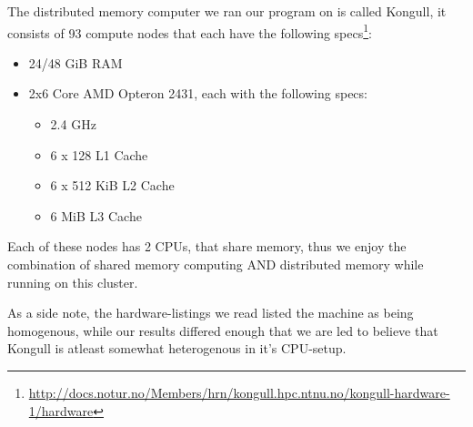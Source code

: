 The distributed memory computer we ran our program on is called Kongull, it consists of 93 compute nodes that each have the following specs\footnote{\url{http://docs.notur.no/Members/hrn/kongull.hpc.ntnu.no/kongull-hardware-1/hardware}}:
\begin{itemize}
    \item 24/48 GiB RAM
    \item 2x6 Core AMD Opteron 2431, each with the following specs:
    \begin{itemize}
        \item 2.4 GHz
        \item 6 x 128 L1 Cache
        \item 6 x 512 KiB L2 Cache
        \item 6 MiB L3 Cache
    \end{itemize}
\end{itemize}

Each of these nodes has 2 CPUs, that share memory, thus we enjoy the combination of shared memory computing AND distributed memory while running on this cluster.

As a side note, the hardware-listings we read listed the machine as being homogenous, while our results differed enough that we are led to believe that Kongull is atleast somewhat heterogenous in it's CPU-setup.